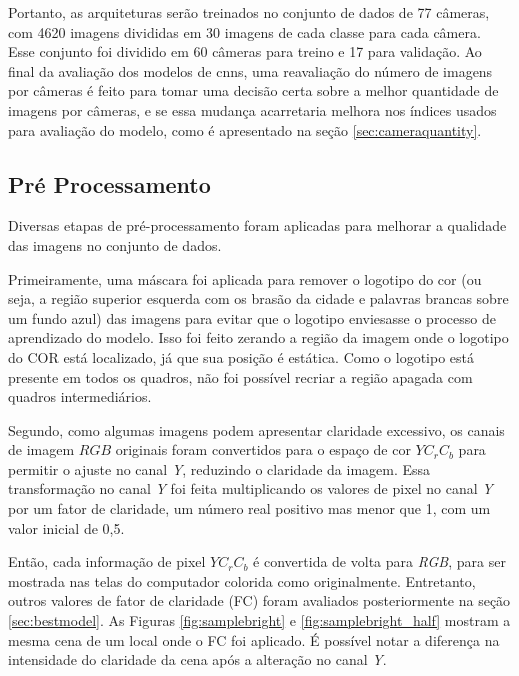 Portanto, as arquiteturas serão treinados no conjunto de dados de 77 câmeras, com 4620 imagens divididas em 30 imagens de cada classe para cada câmera.
Esse conjunto foi dividido em 60 câmeras para treino e 17 para validação.
Ao final da avaliação dos modelos de \acrshort{cnn}s, uma reavaliação do número de imagens por câmeras é feito para tomar uma decisão certa sobre a melhor quantidade de imagens por câmeras, 
e se essa mudança acarretaria melhora nos índices usados para avaliação do modelo, como é apresentado na seção \ref{sec:cameraquantity}.
\subsection{Pré Processamento}\label{subsec:datapreprocessing}

Diversas etapas de pré-processamento foram aplicadas para melhorar a qualidade das imagens no conjunto de dados.

Primeiramente, uma máscara foi aplicada para remover o logotipo do \acrshort{cor} (ou seja, a região superior esquerda com os brasão da cidade e palavras brancas sobre um fundo azul) das imagens para evitar que o logotipo enviesasse o processo de aprendizado do modelo. 
Isso foi feito zerando a região da imagem onde o logotipo do COR está localizado, já que sua posição é estática. 
Como o logotipo está presente em todos os quadros, não foi possível recriar a região apagada com quadros intermediários.

Segundo, como algumas imagens podem apresentar claridade excessivo, os canais de imagem $RGB$ originais foram convertidos para o espaço de cor $YC_rC_b$ para permitir o ajuste no canal \textit{Y}, 
reduzindo o claridade da imagem. Essa transformação no canal \textit{Y} foi feita multiplicando os valores de pixel no canal \textit{Y} por um fator de claridade, 
um número real positivo mas menor que 1, com um valor inicial de 0,5. 

Então, cada informação de pixel $YC_rC_b$ é convertida de volta para  \textit{RGB}, para ser mostrada nas telas do computador colorida como originalmente. 
Entretanto, outros valores de fator de claridade (FC) foram avaliados posteriormente na seção \ref{sec:bestmodel}.
As Figuras \ref{fig:samplebright} e \ref{fig:samplebright_half} mostram a mesma cena de um local onde o FC foi aplicado. 
É possível notar a diferença na intensidade do claridade da cena após a alteração no canal \textit{Y}.

